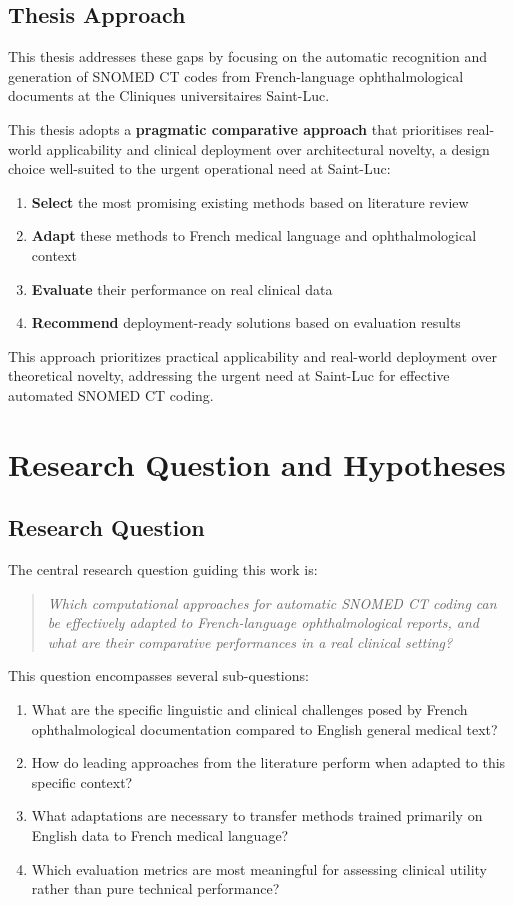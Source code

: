 \subsection{Thesis Approach}

This thesis addresses these gaps by focusing on the automatic recognition and generation of SNOMED CT codes from French-language ophthalmological documents at the Cliniques universitaires Saint-Luc.

This thesis adopts a \textbf{pragmatic comparative approach} that prioritises real-world applicability and clinical deployment over architectural novelty, a design choice well-suited to the urgent operational need at Saint-Luc:
\begin{enumerate}
    \item \textbf{Select} the most promising existing methods based on literature review
    \item \textbf{Adapt} these methods to French medical language and ophthalmological context
    \item \textbf{Evaluate} their performance on real clinical data
    \item \textbf{Recommend} deployment-ready solutions based on evaluation results
\end{enumerate}

This approach prioritizes practical applicability and real-world deployment over theoretical novelty, addressing the urgent need at Saint-Luc for effective automated SNOMED CT coding.

\section{Research Question and Hypotheses}

\subsection{Research Question}

The central research question guiding this work is:

\begin{quote}
\textit{Which computational approaches for automatic SNOMED CT coding can be effectively adapted to French-language ophthalmological reports, and what are their comparative performances in a real clinical setting?}
\end{quote}

This question encompasses several sub-questions:
\begin{enumerate}
    \item What are the specific linguistic and clinical challenges posed by French ophthalmological documentation compared to English general medical text?
    \item How do leading approaches from the literature perform when adapted to this specific context?
    \item What adaptations are necessary to transfer methods trained primarily on English data to French medical language?
    \item Which evaluation metrics are most meaningful for assessing clinical utility rather than pure technical performance?
\end{enumerate}

